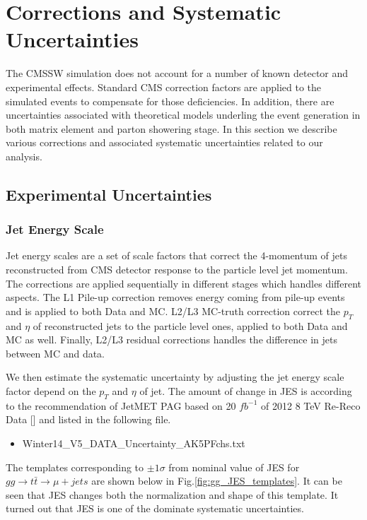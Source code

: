 \documentclass{cmspaperpdf}
\begin{document}
\section{Corrections and Systematic Uncertainties}
\label{sec:corrections}

The CMSSW simulation does not account for a number of known detector and experimental effects.  Standard CMS correction factors are applied to the simulated events to compensate for those deficiencies. In addition, there are uncertainties associated with theoretical models underling the event generation in both matrix element and parton showering stage. In this section we describe various corrections and associated systematic uncertainties related to our analysis.

\subsection{Experimental Uncertainties}

\subsubsection{Jet Energy Scale}
Jet energy scales are a set of scale factors that correct the 4-momentum of jets reconstructed from CMS detector response to the particle level jet momentum. The corrections are applied sequentially in different stages which handles different aspects. The L1 Pile-up correction removes energy coming from pile-up events and is applied to both Data and MC. L2/L3 MC-truth correction correct the $p_T$ and $\eta$ of reconstructed jets to the particle level ones, applied to both Data and MC as well. Finally, L2/L3 residual corrections handles the difference in jets between MC and data.  

We then estimate the systematic uncertainty by adjusting the jet energy scale factor depend on the $p_T$ and $\eta$ of jet. The amount of change in JES is according to the recommendation of JetMET PAG based on 20 $fb^{-1}$ of 2012 8 TeV Re-Reco Data [] and listed in the following file.
\begin{itemize}
\item Winter14\_V5\_DATA\_Uncertainty\_AK5PFchs.txt
\end{itemize}

The templates corresponding to $\pm 1\sigma$ from nominal value of JES for $gg\rightarrow t\bar{t}\rightarrow \mu+jets$ are shown below in Fig.\ref{fig:gg_JES_templates}. It can be seen that JES changes both the normalization and shape of this template. It turned out that JES is one of the dominate systematic uncertainties.
\end{document}
